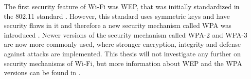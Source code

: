 The first security feature of \gls{Wi-Fi} was \gls{WEP}, that was initially standardized in the 802.11 standard \cite{Datacom}. However, this standard uses symmetric keys and have security flaws in it and therefore a new security mechanism called \gls{WPA} was introduced \cite{WAP}. Newer versions of the security mechanism called \gls{WPA}-2 and \gls{WPA}-3 are now more commonly used, where stronger encryption, integrity and defense against attacks are implemented. This thesis will not investigate any further on security mechanisms of \gls{Wi-Fi}, but more information about \gls{WEP} and the \gls{WPA} versions can be found in \cite{WAP}. 